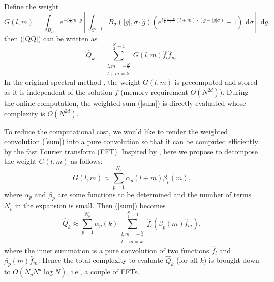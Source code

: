 \documentclass[review,times]{elsarticle}
\newcommand{\rd}{\,\mathrm{d}}
\begin{document}
Define the weight
\begin{equation} \label{weight}
G(l,m)=\int_{B_R}e^{-i\frac{\pi}{L}m \cdot g}\left[\int_{S^{d-1}}B_{\sigma}(|g|,\sigma\cdot \hat{g})\left(e^{i\frac{\pi}{L}\frac{1+e}{4}(l+m)\cdot (g-|g|\sigma)}-1\right)\,\rd{\sigma}\right]\,\rd{g},
\end{equation}
then (\ref{QQ}) can be written as
\begin{equation} \label{sum}
\hat{Q}_k=\sum_{\substack{l,m=-\frac{N}{2}\\l+m=k}}^{\frac{N}{2}-1}G(l,m)\hat{f}_l\hat{f}_m.
\end{equation} 
In the original spectral method \cite{FPT05}, the weight $G(l,m)$ is precomputed and stored as it is independent of the solution $f$ (memory requirement $O(N^{2d})$). During the online computation, the weighted sum (\ref{sum}) is directly evaluated whose complexity is $O(N^{2d})$.

To reduce the computational cost, we would like to render the weighted convolution (\ref{sum}) into a pure convolution so that it can be computed efficiently by the fast Fourier transform (FFT). Inspired by \cite{GHHH17}, here we propose to decompose the weight $G(l,m)$ as follows:
\begin{equation} \label{lowrank}
G(l,m)\approx\sum_{p=1}^{N_p}\alpha_p(l+m)\beta_p(m),
\end{equation}
where $\alpha_p$ and $\beta_p$ are some functions to be determined and the number of terms $N_p$ in the expansion is small. Then (\ref{sum}) becomes
\begin{equation}
\hat{Q}_k\approx \sum_{p=1}^{N_p}\alpha_p(k)\sum_{\substack{l,m=-\frac{N}{2}\\l+m=k}}^{\frac{N}{2}-1}\hat{f}_l  \left(\beta_p(m)\hat{f}_m\right),
\end{equation} 
where the inner summation is a pure convolution of two functions $\hat{f}_l$ and $\beta_p(m)\hat{f}_m$. Hence the total complexity to evaluate $\hat{Q}_k$ (for all $k$) is brought down to $O(N_pN^d\log N)$, i.e., a couple of FFTs.
\end{document}
